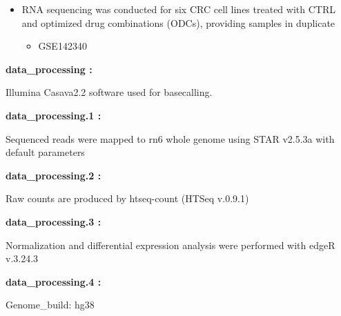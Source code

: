\documentclass[
]{article}
\providecommand{\tightlist}{%
  \setlength{\itemsep}{0pt}\setlength{\parskip}{0pt}}
\begin{document}
\begin{itemize}
\tightlist
\item
  RNA sequencing was conducted for six CRC cell lines treated with CTRL and optimized drug combinations (ODCs), providing samples in duplicate

  \begin{itemize}
  \tightlist
  \item
    GSE142340
  \end{itemize}
\end{itemize}

\begin{center}\begin{tcolorbox}[colback=gray!10, colframe=gray!50, width=0.9\linewidth, arc=1mm, boxrule=0.5pt]
\textbf{
data\_processing
:}

\vspace{0.5em}

    Illumina Casava2.2 software used for basecalling.

\vspace{2em}


\textbf{
data\_processing.1
:}

\vspace{0.5em}

    Sequenced reads were mapped to rn6 whole genome using
STAR v2.5.3a with default parameters

\vspace{2em}


\textbf{
data\_processing.2
:}

\vspace{0.5em}

    Raw counts are produced by htseq-count (HTSeq v.0.9.1)

\vspace{2em}


\textbf{
data\_processing.3
:}

\vspace{0.5em}

    Normalization and differential expression analysis were
performed with edgeR v.3.24.3

\vspace{2em}


\textbf{
data\_processing.4
:}

\vspace{0.5em}

    Genome\_build: hg38

\vspace{2em}



\end{tcolorbox}
\end{center}
\end{document}
